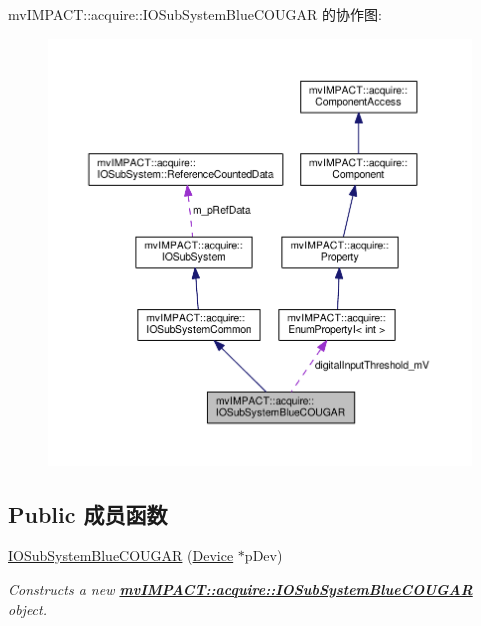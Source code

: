 mv\+I\+M\+P\+A\+C\+T\+:\+:acquire\+:\+:I\+O\+Sub\+System\+Blue\+C\+O\+U\+G\+A\+R 的协作图\+:
\nopagebreak
\begin{figure}[H]
\begin{center}
\leavevmode
\includegraphics[width=350pt]{classmv_i_m_p_a_c_t_1_1acquire_1_1_i_o_sub_system_blue_c_o_u_g_a_r__coll__graph}
\end{center}
\end{figure}
\subsection*{Public 成员函数}
\begin{DoxyCompactItemize}
\item 
\hyperlink{classmv_i_m_p_a_c_t_1_1acquire_1_1_i_o_sub_system_blue_c_o_u_g_a_r_adbc3e17f8f197947024f748d26f1a8b3}{I\+O\+Sub\+System\+Blue\+C\+O\+U\+G\+A\+R} (\hyperlink{classmv_i_m_p_a_c_t_1_1acquire_1_1_device}{Device} $\ast$p\+Dev)
\begin{DoxyCompactList}\small\item\em Constructs a new {\bfseries \hyperlink{classmv_i_m_p_a_c_t_1_1acquire_1_1_i_o_sub_system_blue_c_o_u_g_a_r}{mv\+I\+M\+P\+A\+C\+T\+::acquire\+::\+I\+O\+Sub\+System\+Blue\+C\+O\+U\+G\+A\+R}} object. \end{DoxyCompactList}\end{DoxyCompactItemize}
